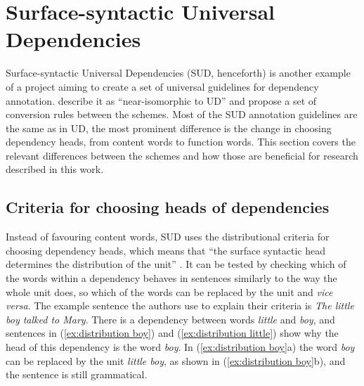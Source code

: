 \section{Surface-syntactic Universal Dependencies}\label{sec:sud}
Surface-syntactic Universal Dependencies (SUD, henceforth) is another example of a project aiming to create a set of universal guidelines for dependency annotation. \cite{gerdes-etal-2018-sud} describe it as ``near-isomorphic to UD'' and propose a set of conversion rules between the schemes. Most of the SUD annotation guidelines are the same as in UD, the most prominent difference is the change in choosing dependency heads, from content words to function words. This section covers the relevant differences between the schemes and how those are beneficial for research described in this work.

\subsection{Criteria for choosing heads of dependencies}\label{sec:sud criteria}
Instead of favouring content words, SUD uses the distributional criteria for choosing dependency heads, which means that ``the surface syntactic head determines the distribution of the unit'' \citep{gerdes-etal-2018-sud}. It can be tested by checking which of the words within a dependency behaves in sentences similarly to the way the whole unit does, so which of the words can be replaced by the unit and \textsl{vice versa}. The example sentence the authors use to explain their criteria is \textsl{The little boy talked to Mary}. There is a dependency between words \textsl{little} and \textsl{boy}, and sentences in (\ref{ex:distribution boy}) and (\ref{ex:distribution little}) show why the head of this dependency is the word \textsl{boy}. In (\ref{ex:distribution boy}a) the word \textsl{boy} can be replaced by the unit \textsl{little boy}, as shown in (\ref{ex:distribution boy}b), and the sentence is still grammatical. 

\begin{exe}
    \ex
    \label{ex:distribution boy}
    \begin{xlist}
    \end{xlist}
\end{exe}

